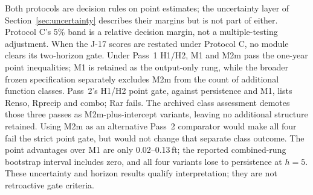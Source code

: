 \begin{center}
\end{center}

Both protocols are decision rules on point estimates; the uncertainty layer of Section~\ref{sec:uncertainty} describes their margins but is not part of either. Protocol C's 5\% band is a relative decision margin, not a multiple-testing adjustment. When the J-17 scores are restated under Protocol C, no module clears its two-horizon gate. Under Pass~1 H1/H2, M1 and M2m pass the one-year point inequalities; M1 is retained as the output-only rung, while the broader frozen specification separately excludes M2m from the count of additional function classes. Pass~2's H1/H2 point gate, against persistence and M1, lists Renso, Rprecip and combo; Rar fails. The archived class assessment demotes those three passes as M2m-plus-intercept variants, leaving no additional structure retained. Using M2m as an alternative Pass~2 comparator would make all four fail the strict point gate, but would not change that separate class outcome. The point advantages over M1 are only 0.02--0.13\,ft; the reported combined-rung bootstrap interval includes zero, and all four variants lose to persistence at $h=5$. These uncertainty and horizon results qualify interpretation; they are not retroactive gate criteria.

